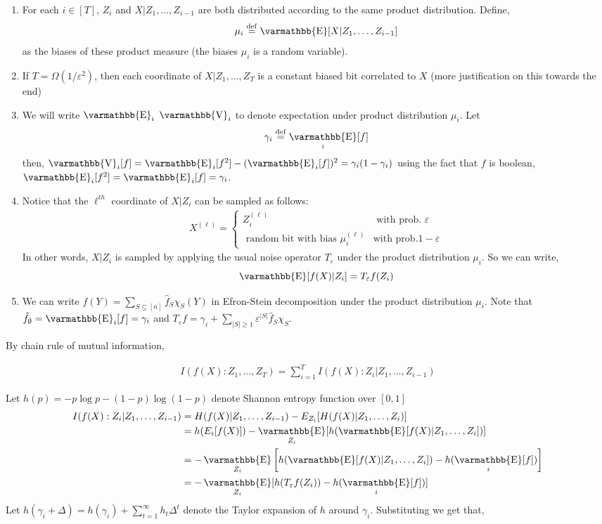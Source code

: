 \documentclass
[12pt,letterpaper]
{article}
\theoremstyle{definition}
\theoremstyle{remark}
\let\mathbb\varmathbb
\newcommand{\Esymb}{\mathbb{E}}
\newcommand{\Vsymb}{\mathbb{V}}
\DeclareMathOperator*{\E}{\Esymb}
\DeclareMathOperator*{\Var}{\Vsymb}
\newcommand{\defeq}{\stackrel{\mathrm{def}}=}
\renewcommand{\geq}{\geqslant}
\let\epsilon=\varepsilon
\numberwithin{equation}{section}
\begin{document}
\begin{enumerate}
	\item For each $i \in [T]$, $Z_i$ and $X|Z_1,\ldots,Z_{i-1}$ are both distributed according to the same product distribution.  Define, 
		$$  \mu_i \defeq \E[ X | Z_1,\ldots, Z_{i-1}]$$
		as the biases of these product measure (the biases $\mu_i$ is a random variable).

	\item If $T = \Omega(1/\epsilon^2)$, then each coordinate of $X | Z_1,\ldots, Z_T$ is a constant biased bit correlated to $X$ (more justification on this towards the end)
	\item We will write $\E_i$ $\Var_i$ to denote expectation under product distribution $\mu_i$.  Let
$$ \gamma_i \defeq \E_i[f] $$
then, $\Var_i[f] = \E_i[f^2] - (\E_i[f])^2 = \gamma_i(1-\gamma_i)$ using the fact that $f$ is boolean, $\E_i [f^2] = \E_i[f] = \gamma_i$.


\item Notice that the $\ell^{th}$ coordinate of  $X| Z_i$ can be sampled as follows:
\begin{align*}
	X^{(\ell)} = \begin{cases}
        Z_i^{(\ell)} & \text{ with prob. } \epsilon\\ 
        \text{ random bit with bias } \mu_i^{(\ell)} & \text{with prob.} 1-\epsilon 
        \end{cases}
 \end{align*}
In other words, $X | Z_i$ is sampled by applying the usual noise operator $T_\epsilon$ under the product distribution $\mu_i$.  So we can write,
$$ \E[f(X)|Z_i] = T_{\epsilon} f (Z_i)$$

\item We can write $f(Y) = \sum_{S \subseteq [n]} \hat{f}_S \chi_S(Y)$ in Efron-Stein decomposition under the product distribution $\mu_i$.  Note that $\hat{f}_{\emptyset} = \E_i [f] = \gamma_i$ and $T_{\epsilon} f = \gamma_i + \sum_{|S| \geq 1} \epsilon^{|S|} \hat{f}_S \chi_S$.

\end{enumerate}

By chain rule of mutual information,

\begin{align*}
	I(f(X): Z_1,\ldots, Z_T) = \sum_{i = 1}^T  I(f(X) : Z_i | Z_1,\ldots, Z_{i-1})
\end{align*}

Let $h(p) =  -p \log p - (1-p)\log{(1-p)}   $ denote Shannon entropy function over $[0,1]$
\begin{align*}
I(f(X) : Z_i | Z_1,\ldots, Z_{i-1}) & = H(f(X)|Z_1,\ldots,Z_{i-1}) - E_{Z_i}[ H(f(X)|Z_1,\ldots,Z_i)]\\
 & = h(E_i[f(X)]) - \E_{Z_i}[ h(\E[f(X)|Z_1,\ldots,Z_{i}])]  \\
 & = - \E_{Z_i}\left[ h(\E[f(X)|Z_1,\ldots,Z_{i}]) - h(\E_i[f])\right] \\
 & = - \E_{Z_i}[ h(T_{\epsilon} f(Z_i)) - h(\E_i[f])] \\
	 \end{align*}
Let $h(\gamma_i + \Delta) = h(\gamma_i) + \sum_{t=1}^{\infty} h_t \Delta^t$ denote the Taylor expansion of $h$ around $\gamma_i$.  Substituting we get that,
\end{document}
